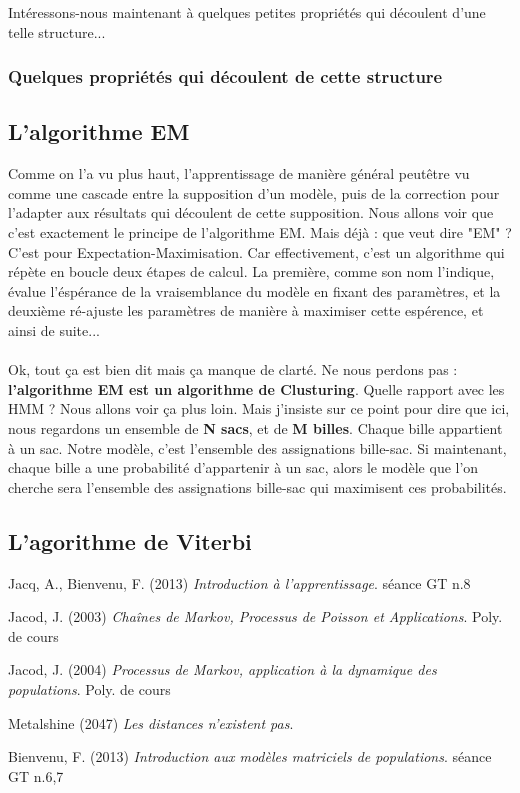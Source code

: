 \documentclass{article}
\begin{document}
Intéressons-nous maintenant à quelques petites propriétés qui découlent d'une telle structure...

\subsubsection{Quelques propriétés qui découlent de cette structure}

\subsection{L'algorithme EM}

Comme on l'a vu plus haut, l'apprentissage de manière général peutêtre vu comme une cascade entre la supposition d'un modèle, puis de la correction pour l'adapter aux résultats qui découlent de cette supposition. Nous allons voir que c'est exactement le principe de l'algorithme EM. Mais déjà : que veut dire "EM" ? C'est pour Expectation-Maximisation. Car effectivement, c'est un algorithme qui répète en boucle deux étapes de calcul. La première, comme son nom l'indique, évalue l'éspérance de la vraisemblance du modèle en fixant des paramètres, et la deuxième ré-ajuste les paramètres de manière à maximiser cette espérence, et ainsi de suite...\\
\\
Ok, tout ça est bien dit mais ça manque de clarté. Ne nous perdons pas : \textbf{l'algorithme EM est un algorithme de Clusturing}. Quelle rapport avec les HMM ? Nous allons voir ça plus loin. Mais j'insiste sur ce point pour dire que ici, nous regardons un ensemble de \textbf{N sacs}, et de \textbf{M billes}. Chaque bille appartient à un sac. Notre modèle, c'est l'ensemble des assignations bille-sac. Si maintenant, chaque bille a une probabilité d'appartenir à un sac, alors le modèle que l'on cherche sera l'ensemble des assignations bille-sac qui maximisent ces probabilités. 

\subsection{L'agorithme de Viterbi}
\newpage
\begin{thebibliography}{9}

  Jacq, A., Bienvenu, F. (2013)
  \emph{Introduction à l'apprentissage}.
  séance GT n.8
  
  Jacod, J. (2003)
  \emph{Cha\^ines de Markov, Processus de Poisson et Applications}.
  Poly. de cours
  
  Jacod, J. (2004)
  \emph{Processus de Markov, application à la dynamique des populations}.
  Poly. de cours

  Metalshine (2047)
  \emph{Les distances n'existent pas}.
  
  Bienvenu, F. (2013)
  \emph{Introduction aux modèles matriciels de populations}.
  séance GT n.6,7
  
  
\end{thebibliography}
\end{document}
